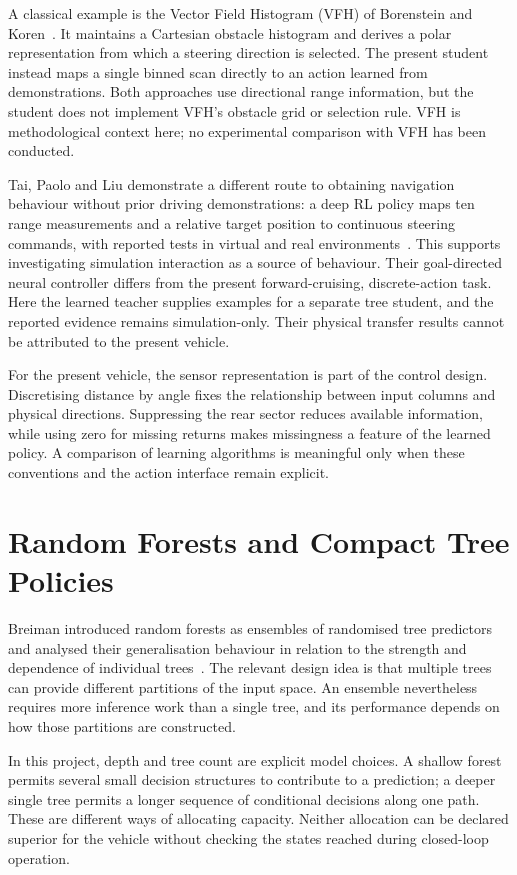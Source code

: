A classical example is the Vector Field Histogram (VFH) of Borenstein and
Koren~\cite{borenstein1991vfh}. It maintains a Cartesian obstacle histogram
and derives a polar representation from which a steering direction is selected.
The present student instead maps a single binned scan directly to an action
learned from demonstrations. Both approaches use directional range information,
but the student does not implement VFH's obstacle grid or selection rule.
VFH is methodological context here; no experimental comparison with VFH has
been conducted.

Tai, Paolo and Liu demonstrate a different route to obtaining navigation
behaviour without prior driving demonstrations: a deep RL policy maps ten range
measurements and a relative target position to continuous steering commands,
with reported tests in virtual and real environments~\cite{tai2017virtual}.
This supports investigating simulation interaction as a source of behaviour.
Their goal-directed neural controller differs from the present forward-cruising,
discrete-action task. Here the learned teacher supplies examples for a separate
tree student, and the reported evidence remains simulation-only. Their physical
transfer results cannot be attributed to the present vehicle.

For the present vehicle, the sensor representation is part of the control
design. Discretising distance by angle fixes the relationship between input
columns and physical directions. Suppressing the rear sector reduces available
information, while using zero for missing returns makes missingness a feature
of the learned policy. A comparison of learning algorithms is meaningful only
when these conventions and the action interface remain explicit.

\section{Random Forests and Compact Tree Policies}
Breiman introduced random forests as ensembles of randomised tree predictors
and analysed their generalisation behaviour in relation to the strength and
dependence of individual trees~\cite{breiman2001random}. The relevant design
idea is that multiple trees can provide different partitions of the input
space. An ensemble nevertheless requires more inference work than a single
tree, and its performance depends on how those partitions are constructed.

In this project, depth and tree count are explicit model choices. A shallow
forest permits several small decision structures to contribute to a prediction;
a deeper single tree permits a longer sequence of conditional decisions along
one path. These are different ways of allocating capacity. Neither allocation
can be declared superior for the vehicle without checking the states reached
during closed-loop operation.

